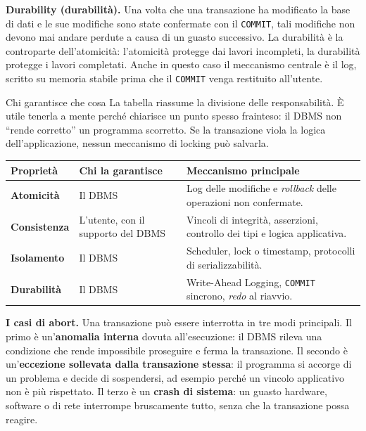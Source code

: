 \documentclass[12pt]{extarticle}
\begin{document}
\medskip
\noindent \textbf{Durability (durabilità).} Una volta che una transazione ha modificato la base di dati e le sue modifiche sono state confermate con il \texttt{COMMIT}, tali modifiche non devono mai andare perdute a causa di un guasto successivo. La durabilità è la controparte dell'atomicità: l'atomicità protegge dai lavori incompleti, la durabilità protegge i lavori completati. Anche in questo caso il meccanismo centrale è il log, scritto su memoria stabile prima che il \texttt{COMMIT} venga restituito all'utente.

\begin{cbox}{Chi garantisce che cosa}
\noindent La tabella riassume la divisione delle responsabilità. È utile tenerla a mente perché chiarisce un punto spesso frainteso: il DBMS non ``rende corretto'' un programma scorretto. Se la transazione viola la logica dell'applicazione, nessun meccanismo di locking può salvarla.
\begin{center}
\small
\begin{tabular}{@{}lp{6.0cm}p{6.0cm}@{}}
    \toprule
    \textbf{Proprietà} & \textbf{Chi la garantisce} & \textbf{Meccanismo principale} \\
    \midrule
    \textbf{Atomicità} & Il DBMS & Log delle modifiche e \textit{rollback} delle operazioni non confermate. \\
    \addlinespace
    \textbf{Consistenza} & L'utente, con il supporto del DBMS & Vincoli di integrità, asserzioni, controllo dei tipi e logica applicativa. \\
    \addlinespace
    \textbf{Isolamento} & Il DBMS & Scheduler, lock o timestamp, protocolli di serializzabilità. \\
    \addlinespace
    \textbf{Durabilità} & Il DBMS & Write-Ahead Logging, \texttt{COMMIT} sincrono, \textit{redo} al riavvio. \\
    \bottomrule
\end{tabular}
\end{center}
\end{cbox}

\medskip
\noindent \textbf{I casi di abort.} Una transazione può essere interrotta in tre modi principali. Il primo è un'\textbf{anomalia interna} dovuta all'esecuzione: il DBMS rileva una condizione che rende impossibile proseguire e ferma la transazione. Il secondo è un'\textbf{eccezione sollevata dalla transazione stessa}: il programma si accorge di un problema e decide di sospendersi, ad esempio perché un vincolo applicativo non è più rispettato. Il terzo è un \textbf{crash di sistema}: un guasto hardware, software o di rete interrompe bruscamente tutto, senza che la transazione possa reagire.
\end{document}
